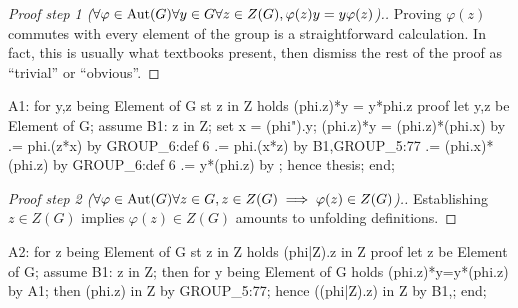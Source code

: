 \begin{proof}[Proof step 1 ($\forall\varphi\in\operatorname{Aut}(G)\forall y\in G\forall z\in Z(G), \varphi(z)y = y\varphi(z)$).]
Proving $\varphi(z)$ commutes with every element of the group is a
straightforward calculation. In fact, this is usually what textbooks
present, then dismiss the rest of the proof as ``trivial'' or
``obvious''.
\end{proof}


\nwenddocs{}\endmoddef\nwstartdeflinemarkup{}\nwenddeflinemarkup
A1: for y,z being Element of G st z in Z
holds (phi.z)*y = y*phi.z
proof
  let y,z be Element of G;
  assume B1: z in Z;
  set x = (phi").y;
  (phi.z)*y = (phi.z)*(phi.x) by 
           .= phi.(z*x) by GROUP_6:def 6
           .= phi.(x*z) by B1,GROUP_5:77
           .= (phi.x)*(phi.z) by GROUP_6:def 6
           .= y*(phi.z) by ;
  hence thesis;
end;
\nwendcode{}\nwdocspar

\begin{proof}[Proof step 2 ($\forall\varphi\in\operatorname{Aut}(G)\forall z\in G, z\in Z(G)\implies \varphi(z)\in Z(G)$).]
Establishing $z\in Z(G)$ implies $\varphi(z)\in Z(G)$ amounts to
unfolding definitions.
\end{proof}

\nwenddocs{}\endmoddef\nwstartdeflinemarkup{}\nwenddeflinemarkup
A2: for z being Element of G st z in Z
holds (phi|Z).z in Z
proof
  let z be Element of G;
  assume B1: z in Z;
  then for y being Element of G holds (phi.z)*y=y*(phi.z) by A1;
  then (phi.z) in Z by GROUP_5:77;
  hence ((phi|Z).z) in Z by B1,;
end;
\nwendcode{}\nwdocspar

